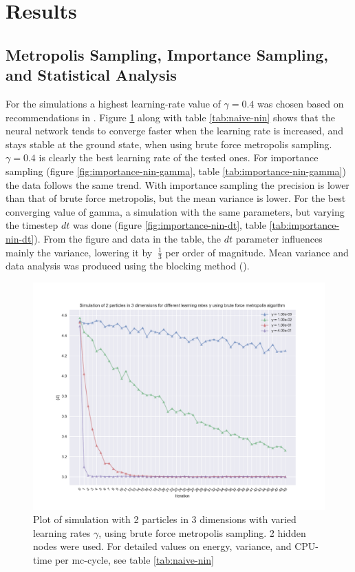 \section{Results}
\subsection{Metropolis Sampling, Importance Sampling, and Statistical Analysis}
For the simulations a highest learning-rate value of $\gamma = 0.4$ was chosen based on recommendations in \cite{Marsland}.
Figure \ref{fig:naive-nin} along with table \ref{tab:naive-nin} shows that the neural network tends to converge faster when the learning rate is increased,
and stays stable at the ground state, when using brute force metropolis sampling. $\gamma = 0.4$ is clearly the best learning rate of the tested ones.
For importance sampling (figure \ref{fig:importance-nin-gamma}, table \ref{tab:importance-nin-gamma})
the data follows the same trend. With importance sampling the precision is lower than that of brute
force metropolis, but the mean variance is lower.
For the best converging value of gamma, a simulation with the same parameters, but varying the
timestep $dt$ was done (figure \ref{fig:importance-nin-dt}, table \ref{tab:importance-nin-dt}).
From the figure and data in the table, the $dt$ parameter influences mainly the variance,
lowering it by $~\frac{1}{3}$ per order of magnitude.
Mean variance and data analysis was produced using the blocking method (\cite{Lectures-blocking}).

\begin{figure}[h]
\hspace{-2.8cm}
\includegraphics[width = \paperwidth]{figures/naive_2p_3d.pdf}
\caption{Plot of simulation with 2 particles in 3 dimensions with varied learning rates $\gamma$, using brute force metropolis sampling.
			2 hidden nodes were used.
			For detailed values on energy, variance, and CPU-time per mc-cycle, see table \ref{tab:naive-nin}}
\label{fig:naive-nin}
\end{figure}

